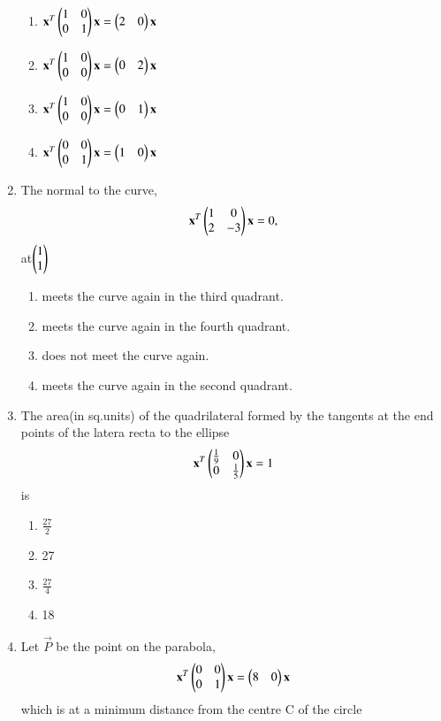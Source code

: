 \documentclass[journal,12pt,twocolumn]{IEEEtran}
\begin{document}
\begin{enumerate}[label=\arabic*]
    \begin{enumerate}
    \item $\mathbf{x}^T\begin{pmatrix}1&0\\0&1\end{pmatrix}\mathbf{x}=\begin{pmatrix}2&0\end{pmatrix}\mathbf{x}$
    \item $\mathbf{x}^T\begin{pmatrix}1&0\\0&0\end{pmatrix}\mathbf{x}=\begin{pmatrix}0&2\end{pmatrix}\mathbf{x}$
    \item $\mathbf{x}^T\begin{pmatrix}1&0\\0&0\end{pmatrix}\mathbf{x}=\begin{pmatrix}0&1\end{pmatrix}\mathbf{x}$
    \item $\mathbf{x}^T\begin{pmatrix}0&0\\0&1\end{pmatrix}\mathbf{x}=\begin{pmatrix}1&0\end{pmatrix}\mathbf{x}$
    \end{enumerate}
    \item The normal to the curve,
    \begin{align}
    \mathbf{x}^T\begin{pmatrix}1&0\\2&-3\end{pmatrix}\mathbf{x}=0,
    \end{align} at$\begin{pmatrix}1\\1\end{pmatrix}$
    \begin{enumerate}
    \item meets the curve again in the third quadrant.
    \item meets the curve again in the fourth quadrant.
    \item does not meet the curve again.
    \item meets the curve again in the second quadrant.
    \end{enumerate}
    \item The area(in sq.units) of the quadrilateral formed by the tangents at the end points of the latera recta to the ellipse 
    \begin{align}
    \mathbf{x}^T\begin{pmatrix}\frac{1}{9}&0\\0&\frac{1}{5}\end{pmatrix}\mathbf{x}=1
    \end{align} is 
    \begin{enumerate}
    \item $\frac{27}{2}$
    \item 27
    \item $\frac{27}{4}$
    \item 18
    \end{enumerate}
    \item Let $\vec{P}$ be the point on the parabola,
    \begin{align}
    \mathbf{x}^T\begin{pmatrix}0&0\\0&1\end{pmatrix}\mathbf{x}=\begin{pmatrix}8&0\end{pmatrix}\mathbf{x}
    \end{align} which is at a minimum distance from the centre C of the circle 

\end{enumerate}
\end{document}
